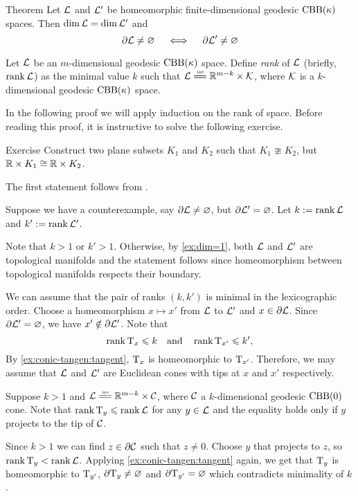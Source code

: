 \begin{thm}{Theorem}
Let $\mathcal{L}$ and $\mathcal{L}'$ be homeomorphic finite-dimensional geodesic $\mathrm{CBB}(\kappa)$ spaces.
Then $\operatorname{\rm dim}\nolimits \mathcal{L}=\operatorname{\rm dim}\nolimits\mathcal{L}'$ and
\[\partial\mathcal{L}\ne \varnothing
\quad\iff\quad
\partial\mathcal{L}'\ne \varnothing
\]
\end{thm}

Let $\mathcal{L}$ be an $m$-dimensional geodesic $\mathrm{CBB}(\kappa)$ space.
Define \emph{rank} of $\mathcal{L}$ (briefly, $\operatorname{\rm rank}\nolimits\mathcal{L}$) as the minimal value $k$ such that $\spc{L}\iso\RR^{m-k}\times \spc{K}$,
where $\mathcal{K}$ is a $k$-dimensional geodesic $\mathrm{CBB}(\kappa)$ space.

In the following proof we will apply induction on the rank of space.
Before reading this proof, it is instructive to solve the following exercise.

\begin{thm}{Exercise}\label{ex:nonstability}
Construct two plane subsets $K_1$ and $K_2$ such that $K_1\ncong K_2$,
but $\mathbb{R}\times K_1\cong \mathbb{R}\times K_2$.
\end{thm}

The first statement follows from .

Suppose we have a counterexample, say $\partial \mathcal{L}\ne \varnothing$, but $\partial \mathcal{L}'=\varnothing$.
Let $k\mathrel{:=}\operatorname{\rm rank}\nolimits \mathcal{L}$ and $k'\mathrel{:=}\operatorname{\rm rank}\nolimits \mathcal{L}'$.

Note that $k>1$ or $k'>1$.
Otherwise, by \ref{ex:dim=1}, both $\mathcal{L}$ and $\mathcal{L}'$ are topological manifolds
and the statement follows since homeomorphism between topological manifolds respects their boundary.

We can assume that the pair of ranks $(k,k')$ is minimal in the lexicographic order.
Choose a homeomorphism $x\mapsto x'$ from $\mathcal{L}$ to $\mathcal{L}'$ 
and $x\in \partial \mathcal{L}$.
Since $\partial \mathcal{L}'=\varnothing$, we have $x'\notin \partial \mathcal{L}'$.
Note that 
\[\operatorname{\rm rank}\nolimits \mathrm{T}_x\leqslant k
\quad\text{and}\quad
\operatorname{\rm rank}\nolimits \mathrm{T}_{x'}\leqslant k',
\]
By \ref{ex:conic-tangen:tangent}, $\mathrm{T}_x$ is homeomorphic to $\mathrm{T}_{x'}$.
Therefore, we may assume that $\mathcal{L}$ and $\mathcal{L}'$ are Euclidean cones with tips at $x$ and $x'$ respectively.


Suppose $k>1$ and $\spc{L}\iso \RR^{m-k}\times \spc{C}$, where $\mathcal{C}$ a $k$-dimensional geodesic $\mathrm{CBB}(0)$ cone.
Note that $\operatorname{\rm rank}\nolimits\mathrm{T}_y\leqslant\operatorname{\rm rank}\nolimits\mathcal{L}$ for any $y\in\mathcal{L}$ and the equality holds only if $y$ projects to the tip of $\mathcal{C}$.

Since $k>1$ we can find $z\in\partial\mathcal{C}$ such that $z\ne 0$.
Choose $y$ that projects to $z$, so $\operatorname{\rm rank}\nolimits\mathrm{T}_y<\operatorname{\rm rank}\nolimits\mathcal{L}$.
Applying \ref{ex:conic-tangen:tangent} again, we get that $\mathrm{T}_y$ is homeomorphic to $\mathrm{T}_{y'}$,
$\partial  \mathrm{T}_y\ne\varnothing$ and $\partial \mathrm{T}_{y'}=\varnothing$ which contradicts minimality of $k$.


